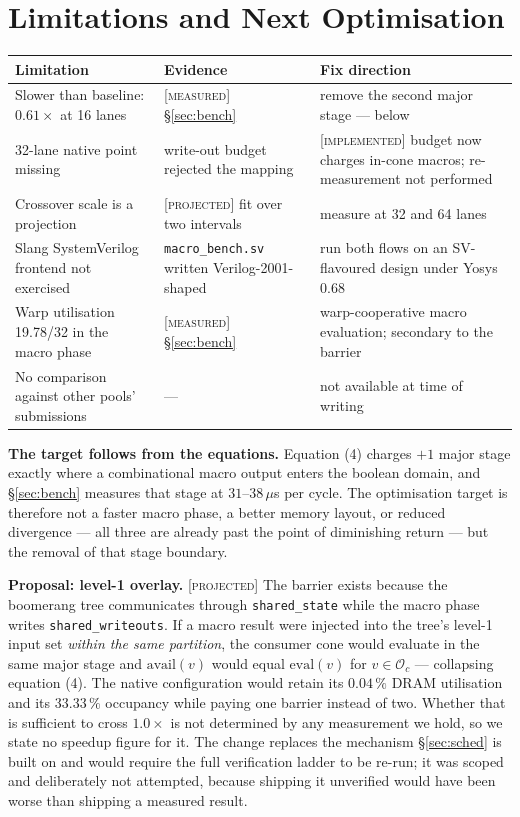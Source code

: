 \documentclass[11pt]{article}
\newcommand{\M}{\textcolor{blue!45!black}{\scriptsize\textsc{[measured]}}}
\newcommand{\I}{\textcolor{note}{\scriptsize\textsc{[implemented]}}}
\newcommand{\Pj}{\textcolor{red!55!black}{\scriptsize\textsc{[projected]}}}
\newcommand{\code}[1]{\texttt{\small #1}}
\begin{document}
\section{Limitations and Next Optimisation}\label{sec:next}

\begin{center}\footnotesize
\begin{tabular}{@{}p{}p{}p{}@{}}
\toprule
Limitation & Evidence & Fix direction\\
\midrule
Slower than baseline: $0.61\times$ at 16 lanes & \M{} \S\ref{sec:bench} & remove the second major stage --- below\\
32-lane native point missing & write-out budget rejected the mapping & \I{} budget now charges in-cone macros; re-measurement not performed\\
Crossover scale is a projection & \Pj{} fit over two intervals & measure at 32 and 64 lanes\\
Slang SystemVerilog frontend not exercised & \code{macro\_bench.sv} written Verilog-2001-shaped & run both flows on an SV-flavoured design under Yosys 0.68\\
Warp utilisation 19.78/32 in the macro phase & \M{} \S\ref{sec:bench} & warp-cooperative macro evaluation; secondary to the barrier\\
No comparison against other pools' submissions & --- & not available at time of writing\\
\bottomrule
\end{tabular}
\end{center}

\textbf{The target follows from the equations.} Equation (4) charges $+1$ major stage
exactly where a combinational macro output enters the boolean domain, and
\S\ref{sec:bench} measures that stage at $31$--$38\,\mu$s per cycle. The optimisation
target is therefore not a faster macro phase, a better memory layout, or reduced
divergence --- all three are already past the point of diminishing return --- but the
removal of that stage boundary.

\textbf{Proposal: level-1 overlay.} \Pj{} The barrier exists because the boomerang tree
communicates through \code{shared\_state} while the macro phase writes
\code{shared\_writeouts}. If a macro result were injected into the tree's level-1
input set \emph{within the same partition}, the consumer cone would evaluate in the
same major stage and $\mathrm{avail}(v)$ would equal $\mathrm{eval}(v)$ for
$v \in \mathcal{O}_c$ --- collapsing equation (4). The native configuration would
retain its $0.04\,\%$ DRAM utilisation and its $33.33\,\%$ occupancy while paying one
barrier instead of two. Whether that is sufficient to cross $1.0\times$ is not
determined by any measurement we hold, so we state no speedup figure for it. The
change replaces the mechanism \S\ref{sec:sched} is built on and would require the full
verification ladder to be re-run; it was scoped and deliberately not attempted, because
shipping it unverified would have been worse than shipping a measured result.
\end{document}
